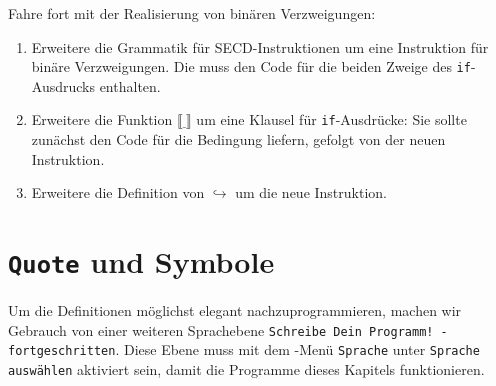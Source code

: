 \begin{aufgabeinline}
  Fahre fort mit der Realisierung von binären Verzweigungen:
  \begin{enumerate}
  \item Erweitere die Grammatik für SECD-Instruktionen um eine
    Instruktion für binäre Verzweigungen.  Die muss den Code für die
    beiden Zweige des \lstinline{if}-Ausdrucks enthalten.
  \item Erweitere die Funktion $\llbracket \underline{~}\rrbracket$
    um eine Klausel für \lstinline{if}-Ausdrücke: Sie sollte zunächst
    den Code für die Bedingung liefern, gefolgt von der neuen
    Instruktion.
  \item Erweitere die Definition von $\hookrightarrow$ um die neue
    Instruktion.
  \end{enumerate}
\end{aufgabeinline}

\section{\texttt{Quote} und Symbole}
\label{sec:quote}

%
Um die Definitionen möglichst elegant nachzuprogrammieren, machen wir 
Gebrauch von einer weiteren
Sprachebene \texttt{Schreibe Dein Programm! -
  fortgeschritten}.  Diese Ebene muss mit dem \drscheme{}-Menü \texttt{Sprache}
unter \texttt{Sprache auswählen} aktiviert sein, damit die
Programme dieses Kapitels funktionieren.

